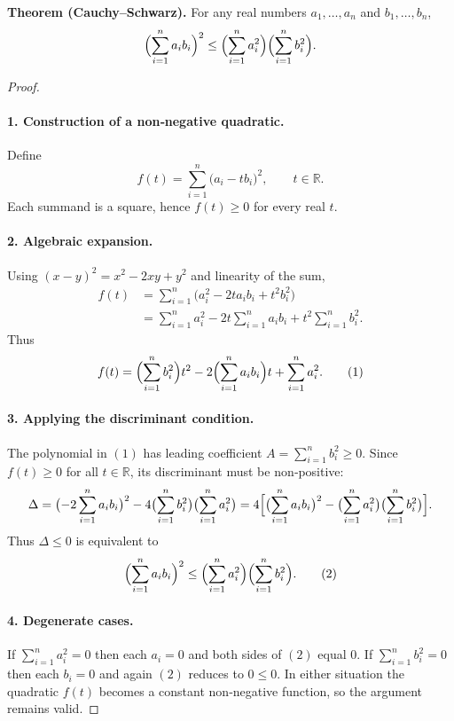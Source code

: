 \textbf{Theorem (Cauchy–Schwarz).}  
For any real numbers \(a_{1},\dots ,a_{n}\) and \(b_{1},\dots ,b_{n}\),
\[
\Bigl(\sum_{i=1}^{n} a_i b_i\Bigr)^{2}
   \le
\Bigl(\sum_{i=1}^{n} a_i^{2}\Bigr)
\Bigl(\sum_{i=1}^{n} b_i^{2}\Bigr).
\]

\begin{proof}
\paragraph{1. Construction of a non‑negative quadratic.}  
Define
\[
f(t)=\sum_{i=1}^{n}\bigl(a_i - t b_i\bigr)^{2},\qquad t\in\mathbb{R}.
\]
Each summand is a square, hence \(f(t)\ge 0\) for every real \(t\).

\paragraph{2. Algebraic expansion.}  
Using \((x-y)^{2}=x^{2}-2xy+y^{2}\) and linearity of the sum,
\begin{align*}
f(t)
   &=\sum_{i=1}^{n}\bigl(a_i^{2}-2t a_i b_i+t^{2}b_i^{2}\bigr) \\
   &=\sum_{i=1}^{n}a_i^{2}
      -2t\sum_{i=1}^{n}a_i b_i
      +t^{2}\sum_{i=1}^{n}b_i^{2}.
\end{align*}
Thus
\begin{equation}
f(t)=\Bigl(\sum_{i=1}^{n}b_i^{2}\Bigr)t^{2}
      -2\Bigl(\sum_{i=1}^{n}a_i b_i\Bigr)t
      +\sum_{i=1}^{n}a_i^{2}. \tag{1}
\end{equation}

\paragraph{3. Applying the discriminant condition.}  
The polynomial in \((1)\) has leading coefficient
\(A=\sum_{i=1}^{n}b_i^{2}\ge 0\).  
Since \(f(t)\ge 0\) for all \(t\in\mathbb{R}\), its discriminant must be non‑positive:
\[
\Delta =\bigl(-2\sum_{i=1}^{n}a_i b_i\bigr)^{2}
        -4\bigl(\sum_{i=1}^{n}b_i^{2}\bigr)
           \bigl(\sum_{i=1}^{n}a_i^{2}\bigr)
      =4\Bigl[\bigl(\sum_{i=1}^{n}a_i b_i\bigr)^{2}
               -\bigl(\sum_{i=1}^{n}a_i^{2}\bigr)
                \bigl(\sum_{i=1}^{n}b_i^{2}\bigr)\Bigr].
\]
Thus \(\Delta\le 0\) is equivalent to
\begin{equation}
\Bigl(\sum_{i=1}^{n}a_i b_i\Bigr)^{2}
   \le
\Bigl(\sum_{i=1}^{n}a_i^{2}\Bigr)
\Bigl(\sum_{i=1}^{n}b_i^{2}\Bigr). \tag{2}
\end{equation}

\paragraph{4. Degenerate cases.}  
If \(\sum_{i=1}^{n}a_i^{2}=0\) then each \(a_i=0\) and both sides of \((2)\) equal \(0\).  
If \(\sum_{i=1}^{n}b_i^{2}=0\) then each \(b_i=0\) and again \((2)\) reduces to \(0\le 0\).  
In either situation the quadratic \(f(t)\) becomes a constant non‑negative
function, so the argument remains valid.


\end{proof}
